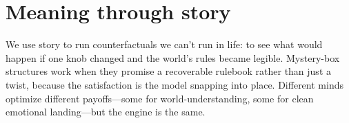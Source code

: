 \part{Meaning through story}
\epigraph{We use story to run counterfactuals we can't run in life: to see what would happen if one knob changed and the world's rules became legible. Mystery-box structures work when they promise a recoverable rulebook rather than just a twist, because the satisfaction is the model snapping into place. Different minds optimize different payoffs---some for world-understanding, some for clean emotional landing---but the engine is the same.}{}
\clearpage
